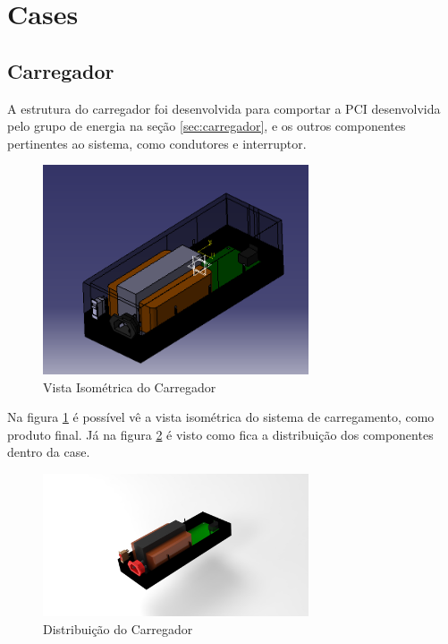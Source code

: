 \section{Cases}

\subsection{Carregador}

\par A estrutura do carregador foi desenvolvida para comportar a PCI desenvolvida pelo grupo de energia na seção \ref{sec:carregador}, e os outros componentes pertinentes ao sistema, como condutores e interruptor. 

\begin{figure}[H]
\centering
\includegraphics[width=0.7\textwidth]{figuras/cad/ISOCARREGADOR.PNG}
\caption{Vista Isométrica do Carregador}
\label{fig:carregador01}
\end{figure}

\par Na figura \ref{fig:carregador01} é possível vê a vista isométrica do sistema de carregamento, como produto final. Já na figura \ref{fig:carregador02} é visto como fica a distribuição dos componentes dentro da case.  

\begin{figure}[H]
\centering
\includegraphics[width=0.7\textwidth]{figuras/cad/untitled.6.jpg}
\caption{Distribuição do Carregador}
\label{fig:carregador02}
\end{figure}

